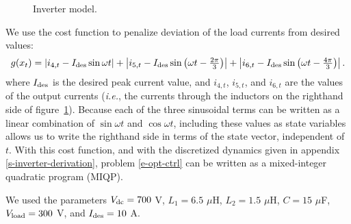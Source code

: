 \documentclass[12pt]{article}
\newcommand{\ie}{{\it i.e.}}
\begin{document}
\begin{figure}
{
}
\caption{
Inverter model.
}
\label{f-inverter}
\end{figure}

We use the cost function to 
penalize deviation of the load currents from desired values:
\[
g(x_t) = 
\left |i_{4,t} - I_{\rm des} \sin \omega t \right | +
\left |i_{5,t} - I_{\rm des} \sin \left(\omega t - \textstyle\frac{2\pi}{3}\right) \right | +
\left |i_{6,t} - I_{\rm des} \sin \left(\omega t - \textstyle\frac{4\pi}{3}\right) \right |.
\]
where $I_{\rm des}$ is the desired peak current value,
and 
$i_{4,t}$,
$i_{5,t}$,
and
$i_{6,t}$
are the values of the output currents
(\ie, the currents through the inductors on the righthand side of figure~\ref{f-inverter}).
Because each of the three sinusoidal terms can be written
as a linear combination of $\sin \omega t$ and $\cos \omega t$,
including these values as state variables
allows us to write the righthand side in terms of the state vector,
independent of $t$.
With this cost function, 
and with the discretized dynamics given in appendix \ref{s-inverter-derivation},
problem \eqref{e-opt-ctrl}  can be written as a mixed-integer quadratic program (MIQP).


We used the parameters $V_{\rm dc} = 700$ V,
$L_1 = 6.5$ $\mu$H,
$L_2 = 1.5$ $\mu$H,
$C = 15$ $\mu$F,
$V_{\rm load} = 300$ V,
and
$I_{\rm des} = 10$ A.
\end{document}
